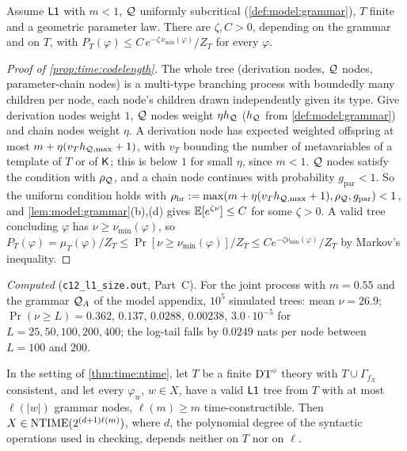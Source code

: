 \begin{proposition}\label{prop:time:codelength}
Assume $\mathord{\mathsf{L1}}$ with $m<1$, $\mathcal{Q}$ uniformly subcritical (\cref{def:model:grammar}), $T$ finite and a geometric parameter law. There are $\zeta,C>0$, depending on the grammar and on $T$, with $P_T(\varphi)\le C\,e^{-\zeta\,\nu_{\min}(\varphi)}/Z_T$ for every $\varphi$.
\end{proposition}

\begin{proof}[Proof of \cref{prop:time:codelength}]
The whole tree (derivation nodes, $\mathcal{Q}$ nodes, parameter-chain nodes) is a multi-type branching process with boundedly many children per node, each node's children drawn independently given its type. Give derivation nodes weight $1$, $\mathcal{Q}$ nodes weight $\eta h_{\mathcal{Q}}$ ($h_{\mathcal{Q}}$ from \cref{def:model:grammar}) and chain nodes weight $\eta$. A derivation node has expected weighted offspring at most $m+\eta(v_Th_{\mathcal{Q},\max}+1)$, with $v_T$ bounding the number of metavariables of a template of $T$ or of $\mathsf{K}$; this is below $1$ for small $\eta$, since $m<1$. $\mathcal{Q}$ nodes satisfy the condition with $\rho_{\mathcal{Q}}$, and a chain node continues with probability $g_{\mathrm{par}}<1$. So the uniform condition holds with $\rho_{\mathrm{br}}:=\max(m+\eta(v_Th_{\mathcal{Q},\max}+1),\rho_{\mathcal{Q}},g_{\mathrm{par}})<1$, and \cref{lem:model:grammar}(b),(d) gives $\mathbb{E}[e^{\zeta\nu}]\le C$ for some $\zeta>0$. A valid tree concluding $\varphi$ has $\nu\ge\nu_{\min}(\varphi)$, so $P_T(\varphi)=\mu_T(\varphi)/Z_T\le\Pr[\nu\ge\nu_{\min}(\varphi)]/Z_T\le Ce^{-\zeta\nu_{\min}(\varphi)}/Z_T$ by Markov's inequality.
\end{proof}

\emph{Computed} (\texttt{c12\_l1\_size.out}, Part~C). For the joint process with $m=0.55$ and the grammar $\mathcal{Q}_A$ of the model appendix, $10^5$ simulated trees: mean $\nu=26.9$; $\Pr(\nu\ge L)=0.362$, $0.137$, $0.0288$, $0.00238$, $3.0\cdot10^{-5}$ for $L=25,50,100,200,400$; the log-tail falls by $0.0249$ nats per node between $L=100$ and $200$.

\begin{theorem}\label{thm:time:log}
In the setting of \cref{thm:time:ntime}, let $T$ be a finite $\mathrm{DT}^{\circ}$ theory with $T\cup\Gamma_{f_X}$ consistent, and let every $\varphi_w$, $w\in X$, have a valid $\mathord{\mathsf{L1}}$ tree from $T$ with at most $\ell(|w|)$ grammar nodes, $\ell(m)\ge m$ time-constructible. Then $X\in\mathrm{NTIME}(2^{(d+1)\ell(m)})$, where $d$, the polynomial degree of the syntactic operations used in checking, depends neither on $T$ nor on $\ell$.
\end{theorem}

